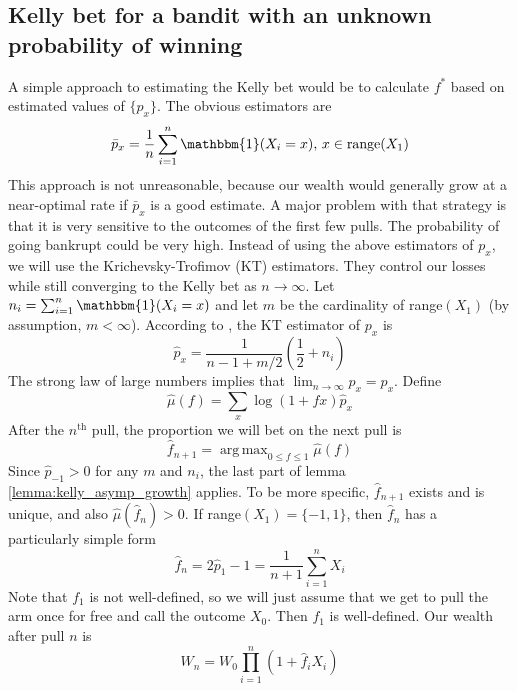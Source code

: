 \documentclass[letterpaper]{article}
\DeclareMathOperator*{\argmax}{arg\,max}
\numberwithin{equation}{section}
\theoremstyle{plain}
\begin{document}
\subsection{Kelly bet for a bandit with an unknown probability of winning}\label{kelly_unknown_prob}
A simple approach to estimating the Kelly bet would be to calculate $f^*$ based on estimated values of $\{p_x\}$. The obvious estimators are
\begin{equation*}
\bar{p}_x = \frac{1}{n} \sum_{i=1}^n \mathbbm{1}(X_i = x),\, x\in\text{range}(X_1)
\end{equation*}
This approach is not unreasonable, because our wealth would generally grow at a near-optimal rate if $\bar{p}_x$ is a good estimate. A major problem with that strategy is that it is very sensitive to the outcomes of the first few pulls. The probability of going bankrupt could be very high. Instead of using the above estimators of $p_x$, we will use the Krichevsky-Trofimov (KT) estimators. They control our losses while still converging to the Kelly bet as $n\to\infty$. Let $n_i = \sum_{i=1}^n \mathbbm{1}(X_i=x)$ and let $m$ be the cardinality of range$(X_1)$ (by assumption, $m < \infty$). According to \cite{cesa2006prediction}, the KT estimator of $p_x$ is
\begin{equation}
\hat{p}_x = \frac{1}{n-1+m/2}\left(\frac{1}{2} + n_i\right)
\end{equation}
The strong law of large numbers implies that $\lim_{n\to\infty} \hat{p}_x = p_x$. Define
\begin{equation*}
\hat{\mu}(f) = \sum_x \log(1+ f x) \hat{p}_x
\end{equation*}
After the $n^\text{th}$ pull, the proportion we will bet on the next pull is
\begin{equation*}
\hat{f}_{n+1} = \argmax_{0\le f\le 1} \hat{\mu}(f)
\end{equation*}
Since $\hat{p}_{-1} > 0$ for any $m$ and $n_i$, the last part of lemma \ref{lemma:kelly_asymp_growth} applies. To be more specific, $\hat{f}_{n+1}$ exists and is unique, and also $\hat{\mu}(\hat{f}_n) > 0$.
If range$(X_1) = \{-1, 1\}$, then $\hat{f}_n$ has a particularly simple form
\begin{equation}
\hat{f}_n = 2\hat{p}_1-1 = \frac{1}{n+1}\sum_{i=1}^n X_i
\end{equation}
Note that $f_1$ is not well-defined, so we will just assume that we get to pull the arm once for free and call the outcome $X_0$. Then $f_1$ is well-defined. Our wealth after pull $n$ is
\begin{equation}
W_n = W_0\prod_{i=1}^n (1+\hat{f}_i X_i)
\end{equation}
\end{document}
